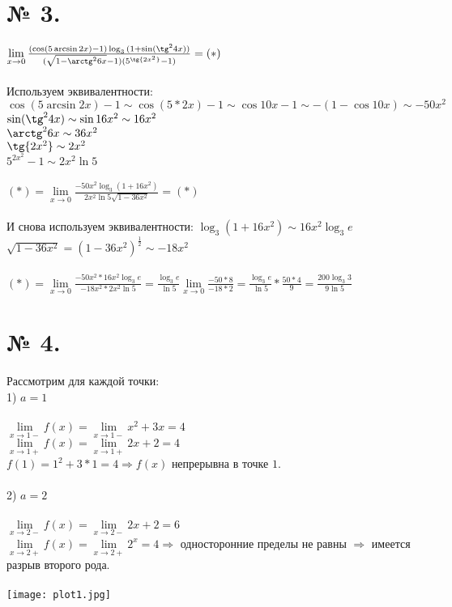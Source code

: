 \documentclass[a4paper,12pt]{report}
\begin{document}
\section{№ 3.}
$\lim\limits_{x \to 0} \frac{(\cos(5\arcsin{2x}) - 1)\log_3{(1 + \sin(\tg^2{4x}))}}{(\sqrt{1 - \arctg^2{6x}} - 1)(5^{\tg{2x^2}} - 1)} = (*)$\\\\
Используем эквивалентности:\\
$\cos(5\arcsin{2x}) - 1 \sim \cos(5 * 2x) - 1 \sim \cos{10x} - 1 \sim -(1 - \cos{10x}) \sim -50x^2$\\
$\sin(\tg^2{4x}) \sim \sin{16x^2} \sim 16x^2$\\
$\arctg^2{6x} \sim 36x^2$\\
$\tg{2x^2} \sim 2x^2$\\
$5^{2x^2} - 1 \sim 2x^2\ln{5}$\\\\
$(*) = \lim\limits_{x \to 0} \frac{-50x^2\log_3{(1 + 16x^2)}}{2x^2\ln{5}\sqrt{1 - 36x^2}} = (*)$\\\\
И снова используем эквивалентности:
$\log_3{(1 + 16x^2)} \sim 16x^2\log_3{e}$\\
$\sqrt{1 - 36x^2} = (1 - 36x^2)^{\frac{1}{2}} \sim -18x^2$\\\\
$(*) = \lim\limits_{x \to 0} \frac{-50x^2 * 16x^2\log_3{e}}{-18x^2 * 2x^2\ln{5}} =  
\frac{\log_3{e}}{\ln{5}}\lim\limits_{x \to 0} \frac{-50 * 8}{-18 * 2} = \frac{\log_3{e}}{\ln{5}} * \frac{50 * 4}{9} = \frac{200\log_3{3}}{9\ln{5}}$\\
\section{№ 4.}
Рассмотрим для каждой точки:\\
1) $a = 1$\\\\
$\lim\limits_{x \to 1-} f(x) = \lim\limits_{x \to 1-} x^2 + 3x = 4$\\
$\lim\limits_{x \to 1+} f(x) = \lim\limits_{x \to 1+} 2x + 2 = 4$\\
$f(1) = 1^2 + 3 * 1 = 4 \Rightarrow f(x)$ непрерывна в точке $1$.\\\\
2) $a = 2$\\\\
$\lim\limits_{x \to 2-} f(x) = \lim\limits_{x \to 2-} 2x + 2 = 6$\\
$\lim\limits_{x \to 2+} f(x) = \lim\limits_{x \to 2+} 2^x = 4 \Rightarrow $ односторонние пределы не равны $\Rightarrow$ имеется разрыв
второго рода.\\
\\
\texttt{[image: plot1.jpg]}
\end{document}
